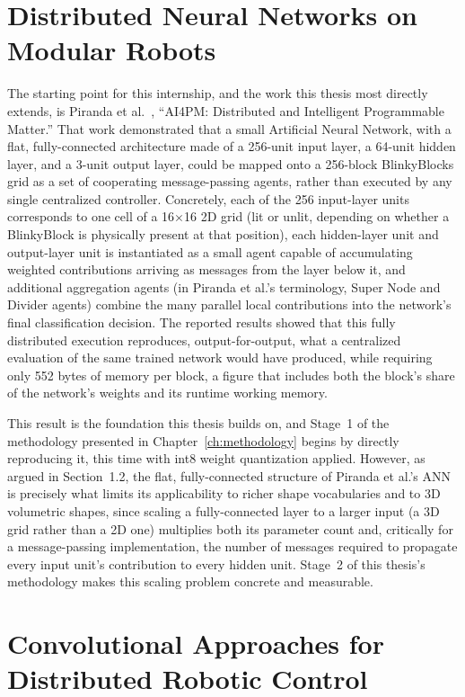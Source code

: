 \documentclass[12pt,a4paper]{report}
\begin{document}
\section{Distributed Neural Networks on Modular Robots}

The starting point for this internship, and the work this thesis most directly extends, is Piranda et al.~\cite{piranda2024ai4pm}, ``AI4PM: Distributed and Intelligent Programmable Matter.'' That work demonstrated that a small Artificial Neural Network, with a flat, fully-connected architecture made of a 256-unit input layer, a 64-unit hidden layer, and a 3-unit output layer, could be mapped onto a 256-block BlinkyBlocks grid as a set of cooperating message-passing agents, rather than executed by any single centralized controller. Concretely, each of the 256 input-layer units corresponds to one cell of a 16$\times$16 2D grid (lit or unlit, depending on whether a BlinkyBlock is physically present at that position), each hidden-layer unit and output-layer unit is instantiated as a small agent capable of accumulating weighted contributions arriving as messages from the layer below it, and additional aggregation agents (in Piranda et al.'s terminology, Super Node and Divider agents) combine the many parallel local contributions into the network's final classification decision. The reported results showed that this fully distributed execution reproduces, output-for-output, what a centralized evaluation of the same trained network would have produced, while requiring only 552 bytes of memory per block, a figure that includes both the block's share of the network's weights and its runtime working memory.

This result is the foundation this thesis builds on, and Stage~1 of the methodology presented in Chapter~\ref{ch:methodology} begins by directly reproducing it, this time with int8 weight quantization applied. However, as argued in Section~1.2, the flat, fully-connected structure of Piranda et al.'s ANN is precisely what limits its applicability to richer shape vocabularies and to 3D volumetric shapes, since scaling a fully-connected layer to a larger input (a 3D grid rather than a 2D one) multiplies both its parameter count and, critically for a message-passing implementation, the number of messages required to propagate every input unit's contribution to every hidden unit. Stage~2 of this thesis's methodology makes this scaling problem concrete and measurable.

\section{Convolutional Approaches for Distributed Robotic Control}
\end{document}
